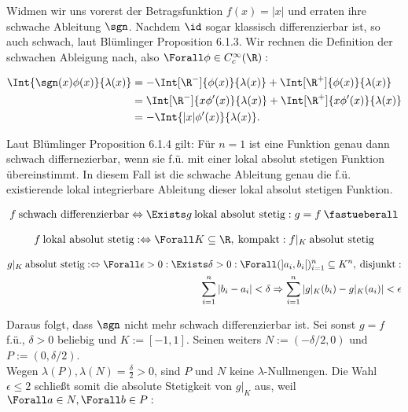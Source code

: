 \begin{solution}

Widmen wir uns vorerst der Betragsfunktion $f(x) = |x|$ und erraten ihre schwache Ableitung $\sgn$. Nachdem $\id$ sogar klassisch differenzierbar ist, so auch schwach, laut Blümlinger Proposition 6.1.3. Wir rechnen die Definition der schwachen Ableigung nach, also $\Forall \phi \in C_c^\infty(\R):$

\begin{align*}
  \Int{\sgn(x) \phi(x)}{\lambda(x)}
  & = - \Int[\R^-]{\phi(x)}{\lambda(x)}
      + \Int[\R^+]{\phi(x)}{\lambda(x)} \\
  & = \Int[\R^-]{x \phi^\prime(x)}{\lambda(x)} +
      \Int[\R^+]{x \phi^\prime(x)}{\lambda(x)} \\
  & = - \Int{|x| \phi^\prime(x)}{\lambda(x)}.
\end{align*}

Laut Blümlinger Proposition 6.1.4 gilt: Für $n = 1$ ist eine Funktion genau dann schwach differnezierbar, wenn sie f.ü. mit einer lokal absolut stetigen Funktion übereinstimmt. In diesem Fall ist die schwache Ableitung genau die f.ü. existierende lokal integrierbare Ableitung dieser lokal absolut stetigen Funktion.

\begin{align*}
  f \: \text{schwach differenzierbar}
  \Leftrightarrow
  \Exists g \: \text{lokal absolut stetig}: g = f \: \fastueberall
\end{align*}

\begin{align*}
  f \: \text{lokal absolut stetig}
  : \Leftrightarrow
  \Forall K \subseteq \R, \: \text{kompakt}:
  f|_K \: \text{absolut stetig}
\end{align*}

\begin{align*}
  g|_K \: \text{absolut stetig}
  : \Leftrightarrow
  \Forall \epsilon > 0: \Exists \delta > 0:
  \Forall (]a_i, b_i[)_{i=1}^n \subseteq K^n, \: \text{disjunkt}: \\
  \sum_{i=1}^n |b_i - a_i| < \delta
  \Rightarrow
  \sum_{i=1}^n |g|_K(b_i) - g|_K(a_i)| < \epsilon
\end{align*}

Daraus folgt, dass $\sgn$ nicht mehr schwach differenzierbar ist. Sei sonst $g = f$ f.ü., $\delta > 0$ beliebig und $K := [-1, 1]$. Seinen weiters $N := (- \delta/2, 0)$ und $P := (0, \delta/2)$. \\

Wegen $\lambda(P), \lambda(N) = \frac{\delta}{2} > 0$, sind $P$ und $N$ keine $\lambda$-Nullmengen. Die Wahl $\epsilon \leq 2$ schließt somit die absolute Stetigkeit von $g|_K$ aus, weil $\Forall a \in N, \Forall b \in P:$


\end{solution}
